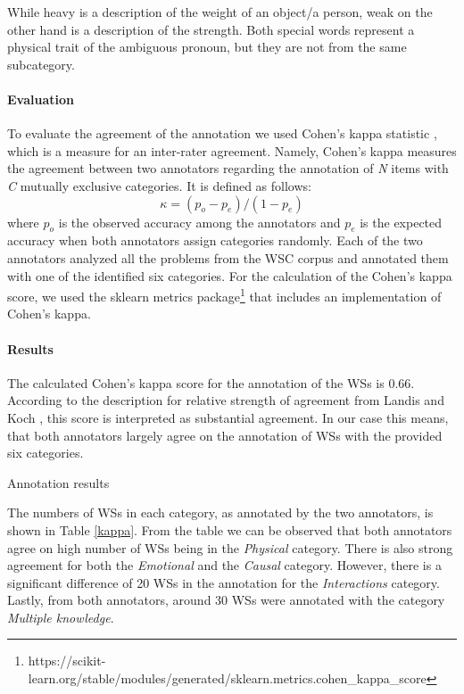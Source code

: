 While heavy is a description of the weight of an object/a person, weak on the other hand is a description of the strength. Both special words represent a physical trait of the ambiguous pronoun, but they are not from the same subcategory.


\paragraph{Evaluation}
To evaluate the agreement of the annotation 
we used Cohen's kappa statistic \cite{doi:10.1177/001316446002000104}, which is a measure for an inter-rater agreement. Namely, Cohen's kappa measures the agreement between two annotators regarding the annotation of \textit{N} items with \textit{C} mutually exclusive categories. 
It is defined as follows: 
\begin{equation}
	\kappa = (p_o-p_e)/(1-p_e)
\end{equation}
where $p_o$ is the observed accuracy among the annotators and $p_e$ is the expected accuracy when both annotators assign categories randomly. Each of the two annotators analyzed all the problems from the WSC corpus and annotated them with one of the identified six categories. For the calculation of the Cohen's kappa score, we used the sklearn metrics  package\footnote{https://scikit-learn.org/stable/modules/generated/sklearn.metrics.cohen\_kappa\_score} that includes an implementation of Cohen's kappa.

\paragraph{Results}
The calculated Cohen's kappa score for the annotation of the WSs is 0.66. According to the description for relative strength of agreement from Landis and Koch \cite{articleM}, this score is interpreted as substantial agreement. In our case this means, that both annotators largely agree on the annotation of WSs with the provided six categories.

\begin{table}
	\centering
	
	\caption{{\label{kappa}}Annotation results}
\end{table}

The numbers of WSs in each category, as annotated by the two annotators, is shown in Table \ref{kappa}.  
From the table we can be observed that both annotators agree on high number of WSs being in the \textit{Physical} category.
There is also strong agreement for both the \textit{Emotional} and the \textit{Causal} category. 
However, there is a significant difference of 20 WSs in the annotation for the \textit{Interactions} category. Lastly, from both annotators, around 30 WSs were annotated with the category \textit{Multiple knowledge}. 


